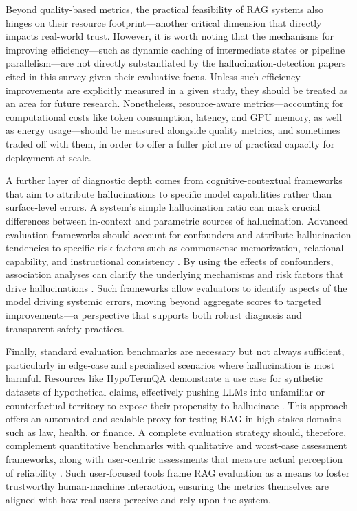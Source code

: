 \documentclass[11pt]{article}
\begin{document}
Beyond quality-based metrics, the practical feasibility of RAG systems also hinges on their resource footprint---another critical dimension that directly impacts real-world trust. However, it is worth noting that the mechanisms for improving efficiency---such as dynamic caching of intermediate states or pipeline parallelism---are not directly substantiated by the hallucination-detection papers cited in this survey given their evaluative focus. Unless such efficiency improvements are explicitly measured in a given study, they should be treated as an area for future research. Nonetheless, resource-aware metrics---accounting for computational costs like token consumption, latency, and GPU memory, as well as energy usage---should be measured alongside quality metrics, and sometimes traded off with them, in order to offer a fuller picture of practical capacity for deployment at scale.

A further layer of diagnostic depth comes from cognitive-contextual frameworks that aim to attribute hallucinations to specific model capabilities rather than surface-level errors. A system's simple hallucination ratio can mask crucial differences between in-context and parametric sources of hallucination. Advanced evaluation frameworks should account for confounders and attribute hallucination tendencies to specific risk factors such as commonsense memorization, relational capability, and instructional consistency \cite{ref170}. By using the effects of confounders, association analyses can clarify the underlying mechanisms and risk factors that drive hallucinations \cite{ref170}. Such frameworks allow evaluators to identify aspects of the model driving systemic errors, moving beyond aggregate scores to targeted improvements---a perspective that supports both robust diagnosis and transparent safety practices.

Finally, standard evaluation benchmarks are necessary but not always sufficient, particularly in edge-case and specialized scenarios where hallucination is most harmful. Resources like HypoTermQA demonstrate a use case for synthetic datasets of hypothetical claims, effectively pushing LLMs into unfamiliar or counterfactual territory to expose their propensity to hallucinate \cite{ref171}. This approach offers an automated and scalable proxy for testing RAG in high-stakes domains such as law, health, or finance. A complete evaluation strategy should, therefore, complement quantitative benchmarks with qualitative and worst-case assessment frameworks, along with user-centric assessments that measure actual perception of reliability \cite{ref172}. Such user-focused tools frame RAG evaluation as a means to foster trustworthy human-machine interaction, ensuring the metrics themselves are aligned with how real users perceive and rely upon the system.
\end{document}
